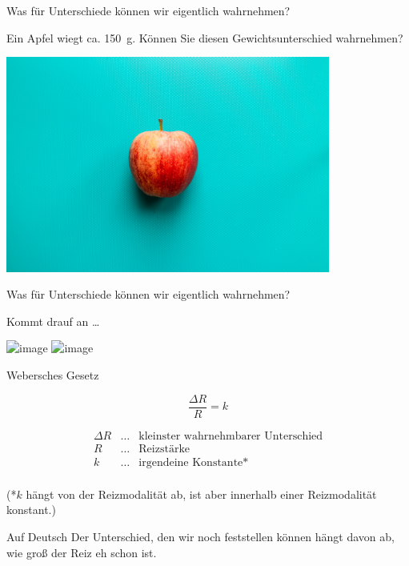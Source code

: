 \documentclass{beamer}
\begin{document}
\begin{frame}{Was für Unterschiede können wir eigentlich wahrnehmen?}

Ein Apfel wiegt ca. \SI{150}{\gram}. Können Sie diesen Gewichtsunterschied wahrnehmen? 


\begin{center}
    \includegraphics[width=0.8\textwidth]{louis-hansel-MardkT836BU-unsplash.jpg}
    
\end{center}

    
\end{frame}


\begin{frame}{Was für Unterschiede können wir eigentlich wahrnehmen?}

Kommt drauf an \dots

\begin{center}
    \includegraphics<1>[width=0.8\textwidth]{priscilla-du-preez-CoqJGsFVJtM-unsplash.jpg}
        \includegraphics<2>[width=0.8\textwidth]{liuba-bilyk-wU_TbWqdPJI-unsplash.jpg}

\end{center}

    
\end{frame}



\begin{frame}{Webersches Gesetz}

\[
\frac{\Delta R}{R} = k
\]

\[
\begin{array}{lll}
\Delta R    & \ldots    & \text{kleinster wahrnehmbarer Unterschied} \\
R           & \ldots    & \text{Reizstärke} \\
k           & \ldots    & \text{irgendeine Konstante*} \\
\end{array}
\]


(*\(k\) hängt von der Reizmodalität ab, ist aber innerhalb einer Reizmodalität konstant.)

\pause

\begin{block}{Auf Deutsch}
Der Unterschied, den wir noch feststellen können hängt davon ab, wie groß der Reiz eh schon ist. 
\end{block}



\end{frame}
\end{document}

